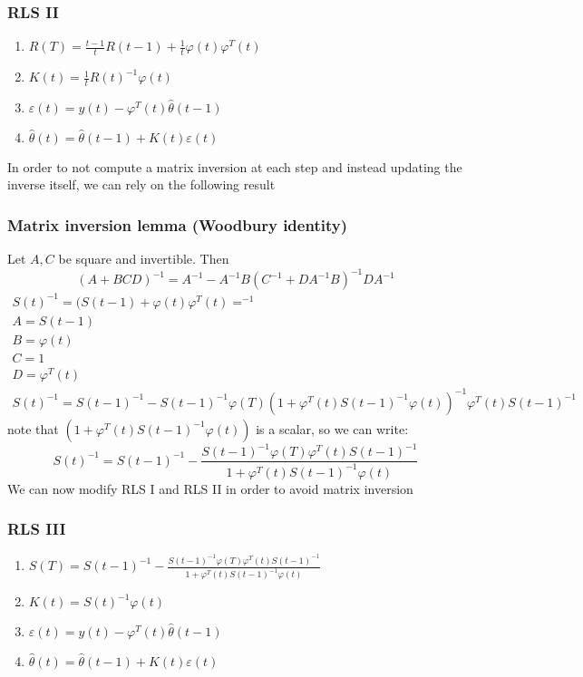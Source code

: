 \documentclass{book}
\theoremstyle{definition}
\theoremstyle{remark}
\theoremstyle{remark}
\begin{document}
\subsubsection{RLS II}
\begin{enumerate}
    \item $R(T) = \frac{t-1}{t}R(t-1) + \frac{1}{t}\varphi(t)\varphi^T(t)$
    \item $K(t) = \frac{1}{t}R(t)^{-1}\varphi(t)$
    \item $\varepsilon(t)=y(t)-\varphi^T(t)\hat{\theta}(t-1)$
    \item $\hat{\theta}(t)=\hat{\theta}(t-1)+K(t)\varepsilon(t)$
\end{enumerate}
In order to not compute a matrix inversion at each step and instead updating the inverse itself, we can rely on the following result
\subsubsection{Matrix inversion lemma (Woodbury identity)}
Let $A,C$ be square and invertible. Then
\[
    (A+BCD)^{-1}=A^{-1}-A^{-1}B(C^{-1}+DA^{-1}B)^{-1}DA^{-1}
\]
\begin{gather*}
    S(t)^{-1}=(S(t-1)+\varphi(t)\varphi^T(t)=^{-1}\\
    A=S(t-1)\\
    B=\varphi(t)\\
    C=1\\
    D=\varphi^T(t)\\
    S(t)^{-1}=S(t-1)^{-1}-S(t-1)^{-1}\varphi(T)(1+\varphi^T(t)S(t-1)^{-1}\varphi(t))^{-1}\varphi^T(t)S(t-1)^{-1}
\end{gather*}
note that $(1+\varphi^T(t)S(t-1)^{-1}\varphi(t))$ is a scalar, so we can write:
\[
    S(t)^{-1}=S(t-1)^{-1}-\frac{S(t-1)^{-1}\varphi(T)\varphi^T(t)S(t-1)^{-1}}{1+\varphi^T(t)S(t-1)^{-1}\varphi(t)}
\]
We can now modify RLS I and RLS II in order to avoid matrix inversion
\subsubsection{RLS III}
\begin{enumerate}
    \item $S(T) = S(t-1)^{-1}-\frac{S(t-1)^{-1}\varphi(T)\varphi^T(t)S(t-1)^{-1}}{1+\varphi^T(t)S(t-1)^{-1}\varphi(t)}
$
    \item $K(t) = S(t)^{-1}\varphi(t)$
    \item $\varepsilon(t)=y(t)-\varphi^T(t)\hat{\theta}(t-1)$
    \item $\hat{\theta}(t)=\hat{\theta}(t-1)+K(t)\varepsilon(t)$
\end{enumerate}
\end{document}
